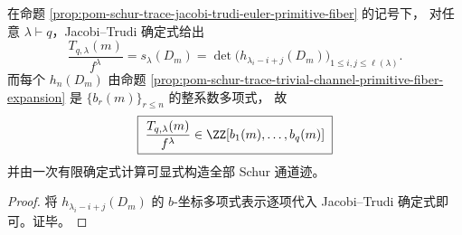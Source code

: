 \begin{corollary}\label{cor:pom-schur-trace-all-channels-primitive-fiber-coordinate}
在命题 \ref{prop:pom-schur-trace-jacobi-trudi-euler-primitive-fiber} 的记号下，
对任意 \(\lambda\vdash q\)，Jacobi--Trudi 确定式给出
\[
\frac{T_{q,\lambda}(m)}{f^\lambda}
=s_\lambda(D_m)
=\det\bigl(h_{\lambda_i-i+j}(D_m)\bigr)_{1\le i,j\le \ell(\lambda)}.
\]
而每个 \(h_n(D_m)\) 由命题 \ref{prop:pom-schur-trace-trivial-channel-primitive-fiber-expansion} 是 \(\{b_r(m)\}_{r\le n}\) 的整系数多项式，
故
\[
\boxed{\;
\frac{T_{q,\lambda}(m)}{f^\lambda}\in \ZZ[b_1(m),\dots,b_q(m)]\;}
\]
并由一次有限确定式计算可显式构造全部 Schur 通道迹。
\end{corollary}
\begin{proof}
将 \(h_{\lambda_i-i+j}(D_m)\) 的 \(b\)-坐标多项式表示逐项代入 Jacobi--Trudi 确定式即可。证毕。
\end{proof}
